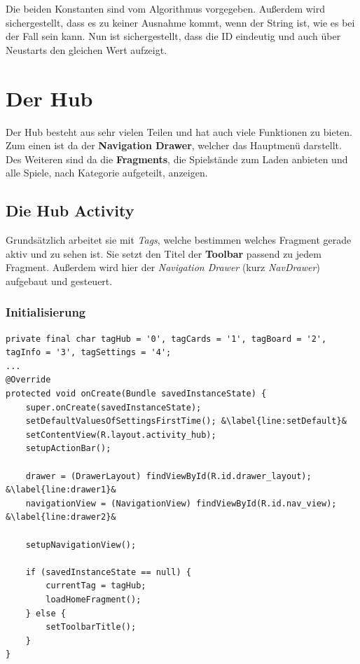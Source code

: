 Die beiden Konstanten sind vom Algorithmus vorgegeben. Außerdem wird
sichergestellt, dass es zu keiner Ausnahme kommt, wenn der String 
ist, wie es bei  der Fall sein kann. Nun ist sichergestellt, dass die
ID eindeutig und auch über Neustarts den gleichen Wert aufzeigt.

\section{Der Hub}
\sectionauthor{\leonard}

Der Hub besteht aus sehr vielen Teilen und hat auch viele Funktionen zu bieten.
Zum einen ist da der \textbf{Navigation Drawer}, welcher das Hauptmenü
darstellt. Des Weiteren sind da die \textbf{Fragments}, die Spielstände zum
Laden anbieten und alle Spiele, nach Kategorie aufgeteilt, anzeigen.

\subsection{Die Hub Activity}

Grundsätzlich arbeitet sie mit \emph{Tags}, welche bestimmen welches Fragment
gerade aktiv und zu sehen ist. Sie setzt den Titel der \textbf{Toolbar} passend
zu jedem Fragment. Außerdem wird hier der \emph{Navigation Drawer}
(kurz \emph{NavDrawer}) aufgebaut und gesteuert.

\subsubsection{Initialisierung}

\begin{lstlisting}[caption={Hub onCreate() Methode},captionpos=b]
private final char tagHub = '0', tagCards = '1', tagBoard = '2', tagInfo = '3', tagSettings = '4';
...
@Override
protected void onCreate(Bundle savedInstanceState) {
	super.onCreate(savedInstanceState);
	setDefaultValuesOfSettingsFirstTime(); &\label{line:setDefault}&
	setContentView(R.layout.activity_hub);
	setupActionBar();

	drawer = (DrawerLayout) findViewById(R.id.drawer_layout); &\label{line:drawer1}&
	navigationView = (NavigationView) findViewById(R.id.nav_view); &\label{line:drawer2}&

	setupNavigationView();

	if (savedInstanceState == null) {
		currentTag = tagHub;
		loadHomeFragment();
	} else {
		setToolbarTitle();
	}
}
\end{lstlisting}

